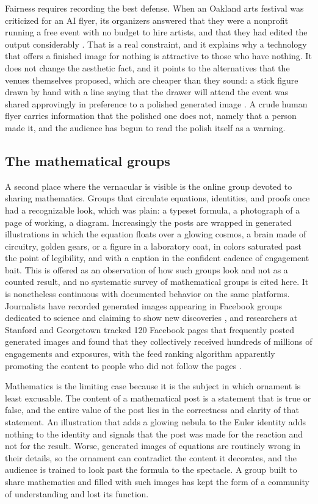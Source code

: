 \documentclass[11pt,a4paper]{article}
\theoremstyle{remark}
\begin{document}
Fairness requires recording the best defense. When an Oakland arts festival was criticized for an AI flyer, its organizers answered that they were a nonprofit running a free event with no budget to hire artists, and that they had edited the output considerably \cite{NPROakland2025}. That is a real constraint, and it explains why a technology that offers a finished image for nothing is attractive to those who have nothing. It does not change the aesthetic fact, and it points to the alternatives that the venues themselves proposed, which are cheaper than they sound: a stick figure drawn by hand with a line saying that the drawer will attend the event was shared approvingly in preference to a polished generated image \cite{CoolDown2026}. A crude human flyer carries information that the polished one does not, namely that a person made it, and the audience has begun to read the polish itself as a warning.

\subsection{The mathematical groups}

A second place where the vernacular is visible is the online group devoted to sharing mathematics. Groups that circulate equations, identities, and proofs once had a recognizable look, which was plain: a typeset formula, a photograph of a page of working, a diagram. Increasingly the posts are wrapped in generated illustrations in which the equation floats over a glowing cosmos, a brain made of circuitry, golden gears, or a figure in a laboratory coat, in colors saturated past the point of legibility, and with a caption in the confident cadence of engagement bait. This is offered as an observation of how such groups look and not as a counted result, and no systematic survey of mathematical groups is cited here. It is nonetheless continuous with documented behavior on the same platforms. Journalists have recorded generated images appearing in Facebook groups dedicated to science and claiming to show new discoveries \cite{NPR2024}, and researchers at Stanford and Georgetown tracked 120 Facebook pages that frequently posted generated images and found that they collectively received hundreds of millions of engagements and exposures, with the feed ranking algorithm apparently promoting the content to people who did not follow the pages \cite{KEYT2024}.

Mathematics is the limiting case because it is the subject in which ornament is least excusable. The content of a mathematical post is a statement that is true or false, and the entire value of the post lies in the correctness and clarity of that statement. An illustration that adds a glowing nebula to the Euler identity adds nothing to the identity and signals that the post was made for the reaction and not for the result. Worse, generated images of equations are routinely wrong in their details, so the ornament can contradict the content it decorates, and the audience is trained to look past the formula to the spectacle. A group built to share mathematics and filled with such images has kept the form of a community of understanding and lost its function.
\end{document}
